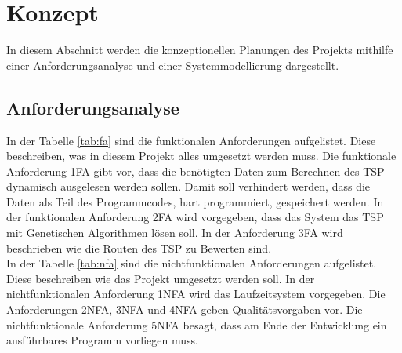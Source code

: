 \section{Konzept}
In diesem Abschnitt werden die konzeptionellen Planungen des Projekts mithilfe einer Anforderungsanalyse und einer Systemmodellierung dargestellt.

\subsection{Anforderungsanalyse}
In der Tabelle \ref{tab:fa} sind die funktionalen Anforderungen aufgelistet. Diese beschreiben, was in diesem Projekt alles umgesetzt werden muss. Die funktionale Anforderung 1FA gibt vor, dass die benötigten Daten zum Berechnen des TSP dynamisch ausgelesen werden sollen. Damit soll verhindert werden, dass die Daten als Teil des Programmcodes, hart programmiert, gespeichert werden.
In der funktionalen Anforderung 2FA wird vorgegeben, dass das System das TSP mit Genetischen Algorithmen lösen soll. In der Anforderung 3FA wird beschrieben wie die Routen des TSP zu Bewerten sind.\\
In der Tabelle \ref{tab:nfa} sind die nichtfunktionalen Anforderungen aufgelistet. Diese beschreiben wie das Projekt umgesetzt werden soll. In der nichtfunktionalen Anforderung 1NFA wird das Laufzeitsystem vorgegeben. Die Anforderungen 2NFA, 3NFA und 4NFA geben Qualitätsvorgaben vor. Die nichtfunktionale Anforderung 5NFA besagt, dass am Ende der Entwicklung ein ausführbares Programm vorliegen muss.


